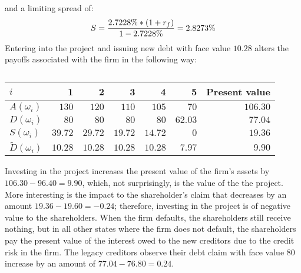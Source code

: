 \documentclass[main.tex]{subfiles}
\begin{document}
        and a limiting spread of:
        \begin{equation}
            S 
            = \frac{
                2.7228\% * (1 + r_{f})
            }{
                1 - 2.7228\%
            } 
            = 2.8273\%
        \end{equation}
        Entering into the project and issuing new debt with face value $10.28$ 
        alters the payoffs associated with the firm in the following way:
        \begin{table}[H]
            \centering
            \begin{tabular}{l|rrrrr||r}
                $i$ & 1 & 2 & 3 & 4 & 5 & Present value \\
                \hline
                $A(\omega_{i})$ & $130$ & $120$ & $110$ & $105$ & $70$ & $106.30$ \\
                $D(\omega_{i})$ & $80$ & $80$ & $80$ & $80$ & $62.03$ & $77.04$ \\
                $S(\omega_{i})$ & $39.72$ & $29.72$ & $19.72$ & $14.72$ & $0$ & $19.36$ \\
                $\tilde{D}(\omega_{i})$ & $10.28$ & $10.28$ & $10.28$ & $10.28$ & $7.97$ & $9.90$ \\
            \end{tabular}
            \caption{}
        \end{table}

        Investing in the project increases the present value of the firm's assets by $106.30 - 96.40 = 9.90$, 
        which, not surprisingly, is the value of the the project.
        More interesting is the impact to the shareholder's claim that decreases by an amount $19.36 - 19.60 = -0.24$; 
        therefore, investing in the project is of negative value to the shareholders.
        When the firm defaults, the shareholders still receive nothing, 
        but in all other states where the firm does not default, 
        the shareholders pay the present value of the interest owed to the new creditors 
        due to the credit risk in the firm.
        The legacy creditors observe their debt claim with face value $80$ increase by an amount of
        $77.04 - 76.80 = 0.24$.
\end{document}
